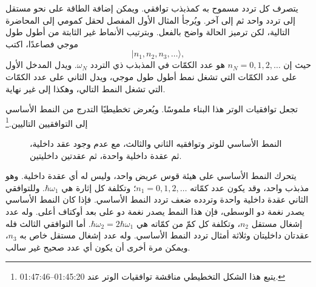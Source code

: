 يتصرف كل تردد مسموح به كمذبذب توافقي. ويمكن إضافة الطاقة على نحو مستقل إلى تردد واحد ثم إلى آخر. ويُرجأ المثال الأول المفصل لحقل كمومي إلى المحاضرة التالية، لكن ترميز الحالة واضح بالفعل. وبترتيب الأنماط غير الثابتة من أطول طول موجي فصاعدًا، اكتب
\begin{equation}
|n_1,n_2,n_3,\ldots\rangle,
\end{equation}
حيث إن \(n_N=0,1,2,\ldots\) هو عدد الكمّات في المذبذب ذي التردد \(\omega_N\). ويدل المدخل الأول على عدد الكمّات التي تشغل نمط أطول طول موجي، ويدل الثاني على عدد الكمّات التي تشغل النمط التالي، وهكذا إلى غير نهاية.

تجعل توافقيات الوتر هذا البناء ملموسًا. ويُعرض تخطيطيًا التدرج من النمط الأساسي إلى التوافقيين التاليين.\footnote{يتبع هذا الشكل التخطيطي مناقشة توافقيات الوتر عند 01:45:20--01:47:46.}

\begin{figure}[t]
\centering
{}
\caption{النمط الأساسي للوتر وتوافقيه الثاني والثالث، مع عدم وجود عقد داخلية، ثم عقدة داخلية واحدة، ثم عقدتين داخليتين.}
\end{figure}

يتحرك النمط الأساسي على هيئة قوس عريض واحد، وليس له أي عقدة داخلية. وهو مذبذب واحد، وقد يكون عدد كمّاته \(n_1=0,1,2,\ldots\)؛ وتكلفة كل إثارة هي \(\hbar\omega_1\). وللتوافقي الثاني عقدة داخلية واحدة وتردده ضعف تردد النمط الأساسي. فإذا كان النمط الأساسي يصدر نغمة دو الوسطى، فإن هذا النمط يصدر نغمة دو على بعد أوكتاف أعلى. وله عدد إشغال مستقل \(n_2\)، وتكلفة كل كمّ من كمّاته هي \(\hbar\omega_2=2\hbar\omega_1\). أما التوافقي الثالث فله عقدتان داخليتان وثلاثة أمثال تردد النمط الأساسي. وله عدد إشغال مستقل خاص به \(n_3\)، ويمكن مرة أخرى أن يكون أي عدد صحيح غير سالب.

